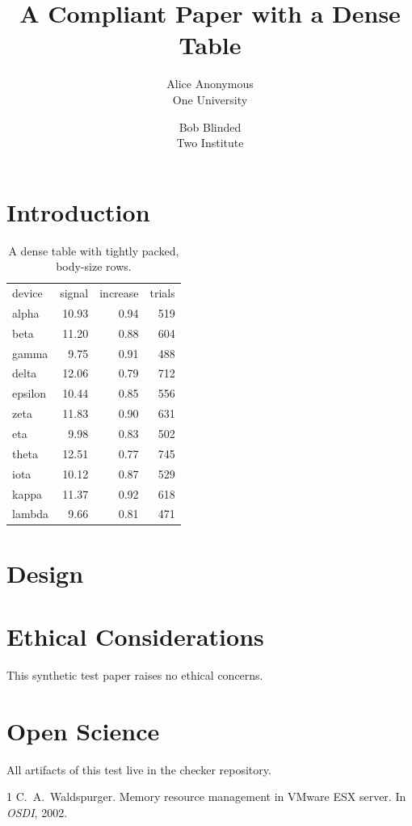 \documentclass[letterpaper,twocolumn,10pt]{article}
\date{}
\title{\Large \bf A Compliant Paper with a Dense Table}
\author{{\rm Alice Anonymous}\\One University \and {\rm Bob Blinded}\\Two Institute}
\begin{document}
\maketitle

\begin{abstract}
\lipsum[1][1-5]
\end{abstract}

\section{Introduction}
\lipsum[2-3]

\begin{table}[t]
  \centering
  \renewcommand{\arraystretch}{0.5}   %
  \begin{tabular}{lrrr}
    device & signal & increase & trials \\
    alpha  & 10.93  & 0.94     & 519    \\
    beta   & 11.20  & 0.88     & 604    \\
    gamma  & 9.75   & 0.91     & 488    \\
    delta  & 12.06  & 0.79     & 712    \\
    epsilon& 10.44  & 0.85     & 556    \\
    zeta   & 11.83  & 0.90     & 631    \\
    eta    & 9.98   & 0.83     & 502    \\
    theta  & 12.51  & 0.77     & 745    \\
    iota   & 10.12  & 0.87     & 529    \\
    kappa  & 11.37  & 0.92     & 618    \\
    lambda & 9.66   & 0.81     & 471    \\
  \end{tabular}
  \caption{A dense table with tightly packed, body-size rows.}
\end{table}

\section{Design}
\lipsum[4-6]

\appendix
\section*{Ethical Considerations}
This synthetic test paper raises no ethical concerns.

\section*{Open Science}
All artifacts of this test live in the checker repository.

\begin{thebibliography}{1}
 C.~A.\ Waldspurger. Memory resource management in VMware ESX
  server. In \emph{OSDI}, 2002.
\end{thebibliography}
\end{document}
